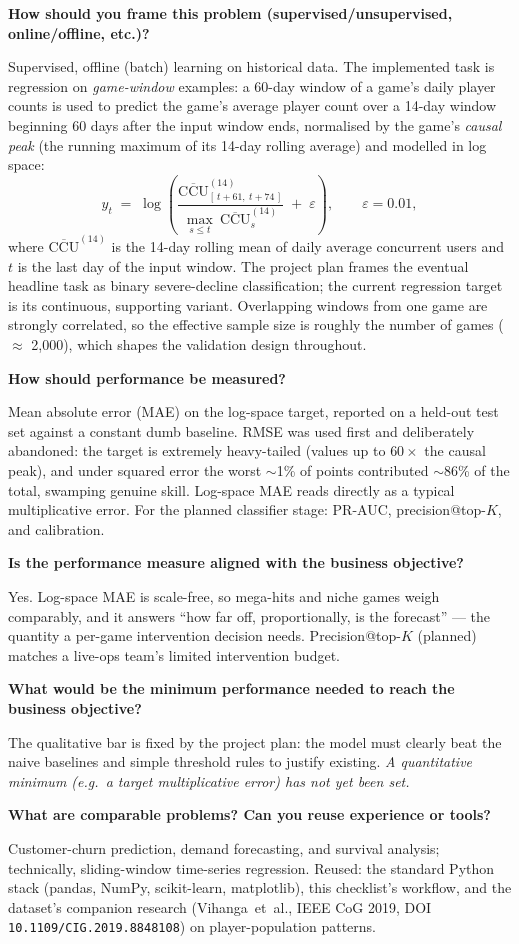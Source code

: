 \documentclass[11pt,a4paper]{article}
\newcommand{\chk}[1]{\item \textbf{#1}\par\nopagebreak\vspace{0.15em}}
\newcommand{\pending}[1][Not yet addressed.]{\textcolor{sttodo}{\itshape #1}}
\begin{document}
\begin{checklist}
\chk{How should you frame this problem (supervised/unsupervised, online/offline, etc.)?}
Supervised, offline (batch) learning on historical data. The implemented
task is regression on \emph{game-window} examples: a 60-day window of a
game's daily player counts is used to predict the game's average player
count over a 14-day window beginning 60 days after the input window ends,
normalised by the game's \emph{causal peak} (the running maximum of its
14-day rolling average) and modelled in log space:
\[
  y_t \;=\; \log\!\left(
    \frac{\overline{\mathrm{CCU}}^{(14)}_{[\,t+61,\ t+74\,]}}
         {\max_{s\le t}\ \overline{\mathrm{CCU}}^{(14)}_s}
    \;+\; \varepsilon
  \right),
  \qquad \varepsilon = 0.01,
\]
where $\overline{\mathrm{CCU}}^{(14)}$ is the 14-day rolling mean of daily
average concurrent users and $t$ is the last day of the input window. The
project plan frames the eventual headline task as binary severe-decline
classification; the current regression target is its continuous, supporting
variant. Overlapping windows from one game are strongly correlated, so the
effective sample size is roughly the number of games ($\approx$ 2{,}000),
which shapes the validation design throughout.

\chk{How should performance be measured?}
Mean absolute error (MAE) on the log-space target, reported on a held-out
test set against a constant dumb baseline. RMSE was used first and
deliberately abandoned: the target is extremely heavy-tailed (values up to
$60\times$ the causal peak), and under squared error the worst
$\sim$1\% of points contributed $\sim$86\% of the total, swamping genuine
skill. Log-space MAE reads directly as a typical multiplicative error. For
the planned classifier stage: PR-AUC, precision@top-$K$, and calibration.

\chk{Is the performance measure aligned with the business objective?}
Yes. Log-space MAE is scale-free, so mega-hits and niche games weigh
comparably, and it answers ``how far off, proportionally, is the forecast''
--- the quantity a per-game intervention decision needs. Precision@top-$K$
(planned) matches a live-ops team's limited intervention budget.

\chk{What would be the minimum performance needed to reach the business objective?}
The qualitative bar is fixed by the project plan: the model must clearly
beat the naive baselines and simple threshold rules to justify existing.
\pending[A quantitative minimum (e.g.\ a target multiplicative error) has
not yet been set.]

\chk{What are comparable problems? Can you reuse experience or tools?}
Customer-churn prediction, demand forecasting, and survival analysis;
technically, sliding-window time-series regression. Reused: the standard
Python stack (pandas, NumPy, scikit-learn, matplotlib), this checklist's
workflow, and the dataset's companion research (Vihanga~et~al., IEEE CoG
2019, DOI \texttt{10.1109/CIG.2019.8848108}) on player-population patterns.


\end{checklist}
\end{document}

